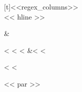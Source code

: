 \documentclass[letterpaper,10pt,english]{sphinxmanual}
\begin{document}
\begin{fulllineitems}
\begin{savenotes}
\begin{tabulary}{\linewidth}[t]{<<regex_columns>>}
\\
<< hline >>\begin{varwidth}[t]{}
\sphinxstyletheadfamily {}
\sphinxbeforeendvarwidth
\end{varwidth}%
&\begin{varwidth}[t]{}<%
\sphinxhline\sphinxstyletheadfamily<%
\hline\sphinxstyletheadfamily<%
&<%
<%
\end{varwidth}%
<%
<%
\end{tabulary}
<< par >>
\sphinxattableend\end{savenotes}

\end{fulllineitems}

\end{document}
